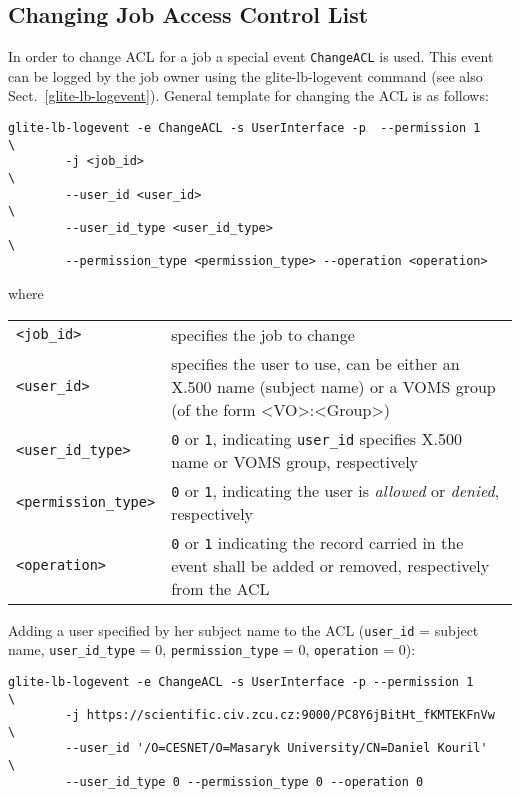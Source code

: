 \subsection{Changing Job Access Control List}
\label{change_acl}

In order to change ACL for a job a special event \verb+ChangeACL+ is used. This
event can be logged by the job owner using the glite-lb-logevent command (see also
Sect.~\ref{glite-lb-logevent}). General template for changing the ACL is as follows:
\begin{verbatim}
glite-lb-logevent -e ChangeACL -s UserInterface -p	--permission 1          \
        -j <job_id>                                                     \
        --user_id <user_id>                                             \
        --user_id_type <user_id_type>                                   \
        --permission_type <permission_type> --operation <operation>
\end{verbatim}

where

\begin{tabularx}{\textwidth}{lX}
\verb'<job_id>'    & specifies the job to change \\
\verb'<user_id>'   & specifies the user to use, can be either an X.500 name
                     (subject name) or a VOMS group (of the form <VO>:<Group>)\\
\verb'<user_id_type>'    & \verb'0' or \verb'1', indicating \verb'user_id'
                     specifies X.500 name or VOMS group, respectively \\
\verb'<permission_type>' & \verb'0' or \verb'1', indicating the user is 
                     \textit{allowed} or \textit{denied}, respectively \\
\verb'<operation>' & \verb'0' or \verb'1' indicating the record carried in
                     the event shall be added or removed, respectively from
		     the ACL \\
\end{tabularx}

Adding a user specified by her subject name to the ACL (\verb'user_id' =
subject name, \verb'user_id_type' = 0, \verb'permission_type' = 0,
\verb'operation' = 0):
\begin{verbatim}
glite-lb-logevent -e ChangeACL -s UserInterface -p --permission 1          \
        -j https://scientific.civ.zcu.cz:9000/PC8Y6jBitHt_fKMTEKFnVw    \
        --user_id '/O=CESNET/O=Masaryk University/CN=Daniel Kouril'     \
        --user_id_type 0 --permission_type 0 --operation 0
\end{verbatim}

